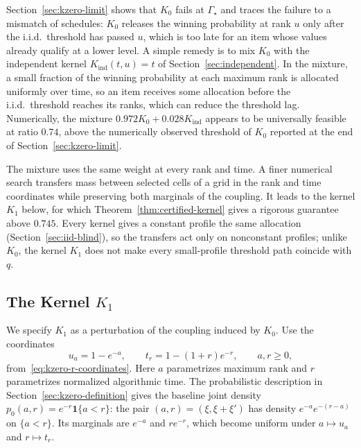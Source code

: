 \documentclass[11pt]{article}
\theoremstyle{definition}
\theoremstyle{remark}
\newcommand{\ind}{\mathbf 1}
\begin{document}
Section~\ref{sec:kzero-limit} shows that $K_0$ fails at $\Gamma_\star$ and traces the failure to a
mismatch of schedules: $K_0$ releases the winning probability at rank $u$ only after the i.i.d.\
threshold has passed $u$, which is too late for an item whose values already qualify at a
lower level. A simple remedy is to mix $K_0$ with the independent kernel
$K_{\mathrm{ind}}(t,u)=t$ of Section~\ref{sec:independent}. In the mixture, a small fraction
of the winning probability at each maximum rank is allocated uniformly over time, so an item
receives some allocation before the i.i.d.\ threshold reaches its ranks, which can reduce the
threshold lag. Numerically, the mixture $0.972K_0+0.028K_{\mathrm{ind}}$ appears to be
universally feasible at ratio $0.74$, above the numerically observed threshold of $K_0$
reported at the end of Section~\ref{sec:kzero-limit}.

The mixture uses the same weight at every rank and time. A finer numerical search transfers
mass between selected cells of a grid in the rank and time coordinates while preserving both
marginals of the coupling. It leads to the kernel $K_1$ below, for which
Theorem~\ref{thm:certified-kernel} gives a rigorous guarantee above $0.745$. Every kernel
gives a constant profile the same allocation (Section~\ref{sec:iid-blind}), so the transfers
act only on nonconstant profiles; unlike $K_0$, the kernel $K_1$ does not make every
small-profile threshold path coincide with $q$.

\subsection{\texorpdfstring{The Kernel $K_1$}{The Kernel K1}}\label{sec:final-definition}


We specify $K_1$ as a perturbation of the coupling induced by $K_0$.
Use the coordinates
\[
 u_a=1-e^{-a},\qquad t_r=1-(1+r)e^{-r},\qquad a,r\ge0,
\]
from~\eqref{eq:kzero-r-coordinates}.
Here $a$ parametrizes maximum rank and $r$ parametrizes normalized
algorithmic time.
The probabilistic description in Section~\ref{sec:kzero-definition}
gives the baseline joint density $p_0(a,r)=e^{-r}\ind\{a<r\}$: the pair $(a,r)=(\xi,\xi+\xi')$ has density $e^{-a}e^{-(r-a)}$ on $\{a<r\}$.
Its marginals are $e^{-a}$ and $re^{-r}$, which become uniform under
$a\mapsto u_a$ and $r\mapsto t_r$.
\end{document}
